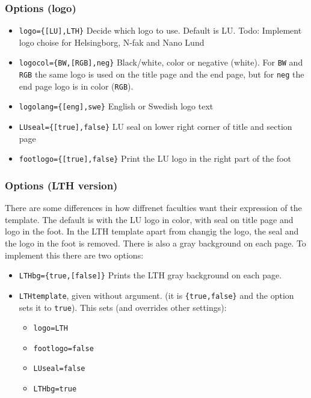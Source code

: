 \documentclass[aspectratio=1610]{beamer}
\begin{document}
\begin{frame}%
  \frametitle{Options (logo)}
  \begin{itemize}
  \item \texttt{logo=\{[LU],LTH\}}\newline
    Decide which logo to use. Default is LU. \newline
    Todo: Implement logo choise for Helsingborg, N-fak and Nano Lund
  \item \texttt{logocol=\{BW,[RGB],neg\}}\newline
    Black/white, color or negative (white). For \texttt{BW} and \texttt{RGB} the same logo is used on the title page and the end page, but for \texttt{neg} the end page logo is in color (\texttt{RGB}).
  \item \texttt{logolang=\{[eng],swe\}}\newline
    English or Swedish logo text
  \item \texttt{LUseal=\{[true],false\}}\newline
    LU seal on lower right corner of title and section page
  \item \texttt{footlogo=\{[true],false\}}\newline
    Print the LU logo in the right part of the foot
  \end{itemize}
\end{frame}

\begin{frame}%
  \frametitle{Options (LTH version)}
  There are some differences in how diffrenet faculties want their expression of the template. The default is with the LU logo in color, with seal on title page and logo in the foot. In the LTH template apart from changig the logo, the seal and the logo in the foot is removed. There is also a gray background on each page. To implement this there are two options:
  \begin{itemize}
  \item \texttt{LTHbg=\{true,[false]\}}\newline
    Prints the LTH gray background on each page. 
  \item \texttt{LTHtemplate}, given without argument. (it is \texttt{\{true,false\}} and the option sets it to \texttt{true}).\newline
    This sets (and overrides other settings):
    \begin{itemize}
    \item \texttt{logo=LTH}
    \item \texttt{footlogo=false}
    \item \texttt{LUseal=false}
    \item \texttt{LTHbg=true}
    \end{itemize}
  \end{itemize}
\end{frame}
\end{document}
